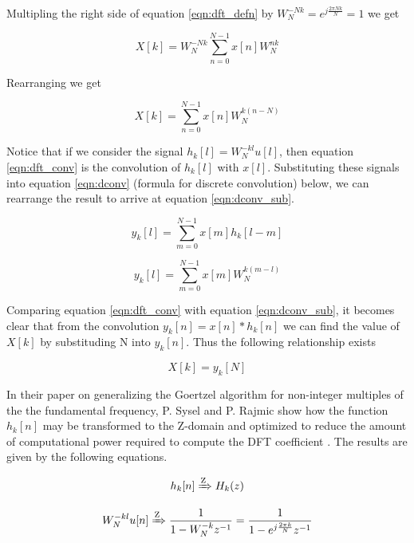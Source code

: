 Multipling the right side of equation \ref{eqn:dft_defn} by \(W_{N}^{-Nk} = e^{j\frac{2\pi N k}{N}} = 1\) we get

\begin{equation}
X[k] = W_{N}^{-Nk}\sum_{n=0}^{N-1}x[n]W_{N}^{nk}
\end{equation}

Rearranging we get

\begin{equation}
\label{eqn:dft_conv}
X[k] = \sum_{n=0}^{N-1}x[n]W_{N}^{k(n-N)}
\end{equation}

Notice that if we consider the signal \(h_k[l] = W_N^{-kl}u[l]\), then equation \ref{eqn:dft_conv} is the convolution of $h_k[l]$ with $x[l]$. Substituting these signals into equation \ref{eqn:dconv} (formula for discrete convolution) below, we can rearrange the result to arrive at equation \ref{eqn:dconv_sub}.

\begin{equation}
	\label{eqn:dconv}
	y_k[l] = \sum_{m=0}^{N-1}x[m]h_k[l - m]
\end{equation}

\begin{equation}
	\label{eqn:dconv_sub}
y_k[l] = \sum_{m=0}^{N-1}x[m]W_N^{k(m-l)}
\end{equation}

Comparing equation \ref{eqn:dft_conv} with equation \ref{eqn:dconv_sub}, it becomes clear that from the convolution $y_k[n] = x[n] * h_k[n]$ we can find the value of $X[k]$ by substituding N into $y_k[n]$. Thus the following relationship exists

\begin{equation}
\label{eqn:goertzel_relationship}
X[k] = y_k[N]
\end{equation}


In their paper on generalizing the Goertzel algorithm for non-integer multiples of the the fundamental frequency, P. Sysel and P. Rajmic show how the function $h_k[n]$ may be transformed to the Z-domain and optimized to reduce the amount of computational power required to compute the DFT coefficient \cite{Sysel2012}. The results are given by the following equations.

\[h_k[n] \xRightarrow{\text{Z}} H_k(z)\]

\begin{equation}
W_N^{-kl}u[n] \xRightarrow{\text{Z}} \frac{1}{1 - W_N^{-k}z^{-1}} = \frac{1}{1 - e^{j\frac{2\pi k}{N}}z^{-1}}
\end{equation}

